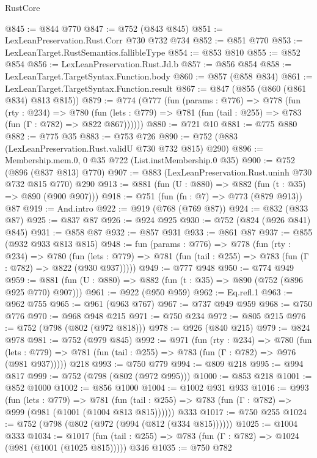 \begin{lexlean}{RustCore}
\begin{coremodule}
@845 := @844 @770
@847 := @752 (@843 @845)
@851 := LexLeanPreservation.Rust.Corr @730 @732 @734
@852 := @851 @770
@853 := LexLeanTarget.RustSemantics.fallibleType
@854 := @853 @810
@855 := @852 @854
@856 := LexLeanPreservation.Rust.Jd.b
@857 := @856 @854
@858 := LexLeanTarget.TargetSyntax.Function.body
@860 := @857 (@858 @834)
@861 := LexLeanTarget.TargetSyntax.Function.result
@867 := @847 (@855 (@860 (@861 @834) @813 @815))
@879 := @774
    (@777
      (fun (params : @776) =>
      @778
        (fun (rty : @234) =>
        @780
          (fun (lets : @779) => @781 (fun (tail : @255) => @783 (fun (Γ : @782) => @822 @867))))))
@880 := @721 @10
@881 := @775 @880
@882 := @775 @35
@883 := @753 @726
@890 := @752 (@883 (LexLeanPreservation.Rust.validU @730 @732 @815) @290)
@896 := Membership.mem.{0, 0} @35 @722 (List.instMembership.{0} @35)
@900 := @752 (@896 (@837 @813) @770)
@907 := @883 (LexLeanPreservation.Rust.uninh @730 @732 @815 @770) @290
@913 := @881 (fun (U : @880) => @882 (fun (t : @35) => @890 (@900 @907)))
@918 := @751 (fun (fn : @7) => @773 (@879 @913)) @87
@919 := And.intro
@922 := @919 (@768 (@769 @87))
@924 := @832 (@833 @87)
@925 := @837 @87
@926 := @924 @925
@930 := @752 (@824 (@926 @841) @845)
@931 := @858 @87
@932 := @857 @931
@933 := @861 @87
@937 := @855 (@932 @933 @813 @815)
@948 := fun (params : @776) =>
  @778
    (fun (rty : @234) =>
    @780
      (fun (lets : @779) => @781 (fun (tail : @255) => @783 (fun (Γ : @782) => @822 (@930 @937)))))
@949 := @777 @948
@950 := @774 @949
@959 := @881 (fun (U : @880) => @882 (fun (t : @35) => @890 (@752 (@896 @925 @770) @907)))
@961 := @922 (@950 @959)
@962 := Eq.refl.{1}
@963 := @962 @755
@965 := @961 (@963 @767)
@967 := @737 @949 @959
@968 := @750 @776
@970 := @968 @948 @215
@971 := @750 @234
@972 := @805 @215
@976 := @752 (@798 (@802 (@972 @818)))
@978 := @926 (@840 @215)
@979 := @824 @978
@981 := @752 (@979 @845)
@992 := @971
    (fun (rty : @234) =>
    @780
      (fun (lets : @779) => @781 (fun (tail : @255) => @783 (fun (Γ : @782) => @976 (@981 @937)))))
    @218
@993 := @750 @779
@994 := @809 @218
@995 := @994 @817
@999 := @752 (@798 (@802 (@972 @995)))
@1000 := @853 @218
@1001 := @852 @1000
@1002 := @856 @1000
@1004 := @1002 @931 @933
@1016 := @993
    (fun (lets : @779) =>
    @781 (fun (tail : @255) => @783 (fun (Γ : @782) => @999 (@981 (@1001 (@1004 @813 @815))))))
    @333
@1017 := @750 @255
@1024 := @752 (@798 (@802 (@972 (@994 (@812 (@334 @815))))))
@1025 := @1004 @333
@1034 := @1017
    (fun (tail : @255) => @783 (fun (Γ : @782) => @1024 (@981 (@1001 (@1025 @815)))))
    @346
@1035 := @750 @782

\end{coremodule}
\end{lexlean}
